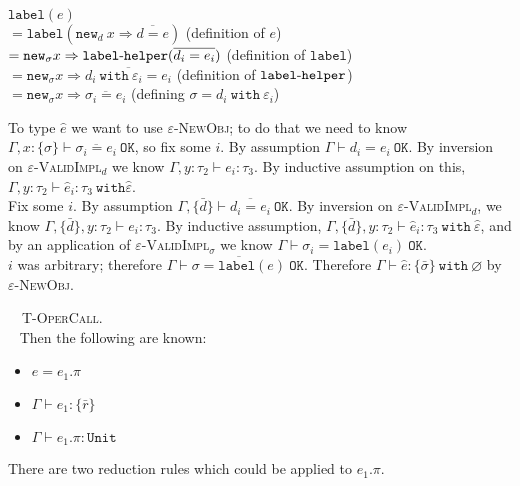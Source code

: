 \documentclass{llncs}
\newcommand{\keywadj}[1]{\mathtt{#1}}
\newcommand{\keyw}[1]{\keywadj{#1}~}
\newcommand{\kw}[1]{\keyw{ #1 }}
\newcommand{\kwa}[1]{\keywadj{ #1 }}
\newcommand{\hyphen}{\hbox{-}}
\newcommand{\proofcase}[2]{
	\begin{adjustwidth}{1.5em}{0pt}
		\fbox{Case.}~~#1. \\ ~#2
	\end{adjustwidth}
}
\newcommand{\newd}[0]{
	\keywadj{new}_d~x \Rightarrow \overline{d = e}
}
\begin{document}
{{\begin{adjustwidth}{1.5em}{0em}
$\kwa{label}(e)$ \\
$= \kwa{label}(\newd)$
\tabto{18em} (definition of $e$) \\
$= \kwa{new}_\sigma x \Rightarrow \kwa{label \hyphen helper}(\overline{d_i = e_i})$
\tabto{18em} (definition of $\kwa{label}$) \\
$= \kwa{new}_\sigma x \Rightarrow \overline{d_i~\kw{with} \varepsilon_i = e_i}$ 
\tabto{18em} (definition of $\kwa{label \hyphen helper}$) \\
$= \kwa{new}_\sigma x \Rightarrow \overline{\sigma_i = e_i}$
\tabto{18em} (defining $\sigma = d_i~\kw{with} \varepsilon_i$)
\end{adjustwidth}

\noindent
To type $\hat e$ we want to use \textsc{$\varepsilon$-NewObj}; to do that we need to know $\Gamma, x : \{ \sigma \} \vdash \overline{\sigma_i = e_i}~\kwa{OK}$, so fix some $i$. By assumption $\Gamma \vdash d_i = e_i~\kwa{OK}$. By inversion on \textsc{$\varepsilon$-ValidImpl$_d$} we know $\Gamma, y : \tau_2 \vdash e_i : \tau_3$. By inductive assumption on this, $\Gamma, y : \tau_2 \vdash \hat e_i : \tau_3~\kwa{with} \hat \varepsilon$. \\

\noindent
Fix some $i$. By assumption $\Gamma, \{ \bar d \} \vdash \overline{d_i = e_i}~\kwa{OK}$. By inversion on \textsc{$\varepsilon$-ValidImpl$_d$}, we know $\Gamma, \{ \bar d \}, y : \tau_2 \vdash e_i : \tau_3$. By inductive assumption, $\Gamma, \{ \bar d \}, y : \tau_2 \vdash \hat e_i : \tau_3~\kw{with} \hat \varepsilon$, and by an application of \textsc{$\varepsilon$-ValidImpl$_\sigma$} we know $\Gamma \vdash \sigma_i = \kwa{label}(e_i)~\kwa{OK}$. \\

\noindent
$i$ was arbitrary; therefore $\Gamma \vdash \overline{\sigma = \kwa{label}(e)}~\kwa{OK}$. Therefore $\Gamma \vdash \hat e : \{ \bar \sigma \}~\kw{with} \varnothing$ by \textsc{$\varepsilon$-NewObj}.\\

}


\proofcase{\textsc{T-OperCall}}{
Then the following are known:
\begin{itemize}
	\item $e = e_1.\pi$
	\item $\Gamma \vdash e_1 : \{ \bar r \}$
	\item $\Gamma \vdash e_1.\pi : \keywadj{Unit}$
\end{itemize}
There are two reduction rules which could be applied to $e_1.\pi$.\\

}}
\end{document}
